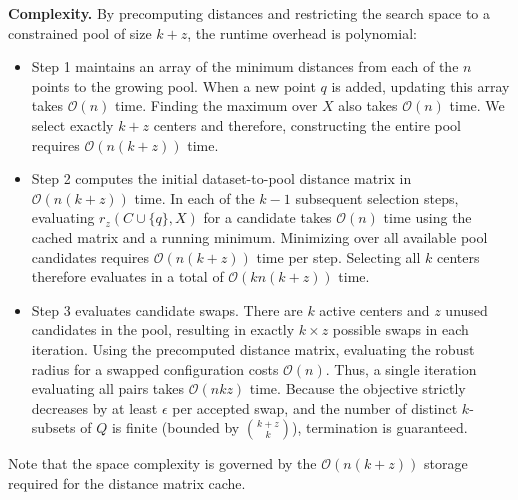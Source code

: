 \documentclass[twoside,leqno,twocolumn]{article}
\begin{document}
\textbf{Complexity.} By precomputing distances and restricting the search space to a constrained pool of size $k+z$, the runtime overhead is polynomial:
\begin{itemize}
    \item Step 1 maintains an array of the minimum distances from each of the $n$ points to the growing pool. When a new point $q$ is added, updating this array takes $\mathcal{O}(n)$ time. Finding the maximum over $X$ also takes $\mathcal{O}(n)$ time. We select exactly $k+z$ centers and therefore, constructing the entire pool requires $\mathcal{O}(n(k+z))$ time.

    \item Step 2 computes the initial dataset-to-pool distance matrix in $\mathcal{O}(n(k+z))$ time. In each of the $k-1$ subsequent selection steps, evaluating $r_z(C \cup \{q\}, X)$ for a candidate takes $\mathcal{O}(n)$ time using the cached matrix and a running minimum. Minimizing over all available pool candidates requires $\mathcal{O}(n(k+z))$ time per step. Selecting all $k$ centers therefore evaluates in a total of $\mathcal{O}(kn(k+z))$ time.

    \item Step 3 evaluates candidate swaps. There are $k$ active centers and $z$ unused candidates in the pool, resulting in exactly $k \times z$ possible swaps in each iteration. Using the precomputed distance matrix, evaluating the robust radius for a swapped configuration costs $\mathcal{O}(n)$. Thus, a single iteration evaluating all pairs takes $\mathcal{O}(nkz)$ time. Because the objective strictly decreases by at least $\epsilon$ per accepted swap, and the number of distinct $k$-subsets of $Q$ is finite (bounded by $\binom{k+z}{k}$), termination is guaranteed.
\end{itemize}

Note that the space complexity is governed by the $\mathcal{O}(n(k+z))$ storage required for the distance matrix cache.
\end{document}
